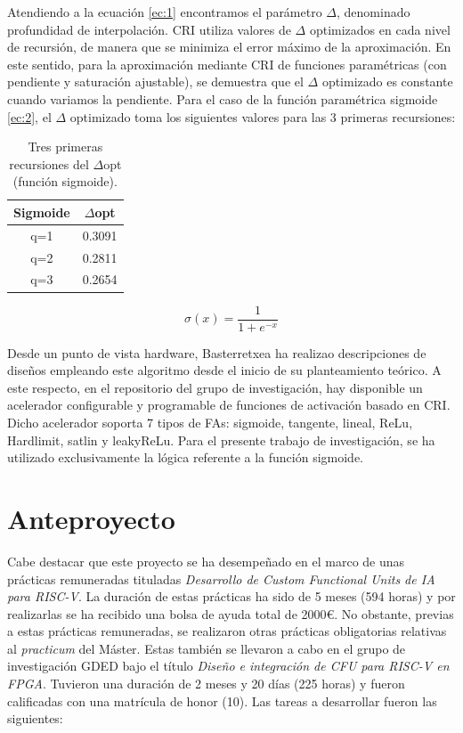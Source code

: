 Atendiendo a la ecuación \eqref{ec:1} encontramos el parámetro $\Delta$, denominado profundidad de interpolación.
CRI utiliza valores de $\Delta$ optimizados en cada nivel de recursión, de manera que se minimiza el error máximo de la aproximación.
En este sentido, para la aproximación mediante CRI de funciones paramétricas (con pendiente y saturación ajustable), se demuestra que el $\Delta$ optimizado es constante cuando variamos la pendiente.
Para el caso de la función paramétrica sigmoide \eqref{ec:2}, el $\Delta$ optimizado toma los siguientes valores para las 3 primeras recursiones:

\begin{table}[h!]
\centering
\caption{Tres primeras recursiones del $\Delta$opt (función sigmoide).}
\label{tab:1}
\begin{tabular}{|c|c|}
\hline
Sigmoide & $\Delta$opt    \\ \hline
q=1      & 0.3091 \\ \hline
q=2      & 0.2811 \\ \hline
q=3      & 0.2654 \\ \hline
\end{tabular}
\end{table}

\begin{equation}\label{ec:2}
\sigma(x)= \frac{1}{1 + e^{-x}}\tag{**}
\end{equation}

Desde un punto de vista hardware, Basterretxea ha realizao descripciones de diseños empleando este algoritmo desde el inicio de su planteamiento teórico.
A este respecto, en el repositorio del grupo de investigación, hay disponible un acelerador configurable y programable de funciones de activación basado en CRI.
Dicho acelerador soporta 7 tipos de FAs: sigmoide, tangente, lineal, ReLu, Hardlimit, satlin y leakyReLu. 
Para el presente trabajo de investigación, se ha utilizado exclusivamente la lógica referente a la función sigmoide.

\section{Anteproyecto}

\label{antepro}

Cabe destacar que este proyecto se ha desempeñado en el marco de unas prácticas remuneradas tituladas \textit{Desarrollo de Custom Functional Units de IA para RISC-V}.
La duración de estas prácticas ha sido de 5 meses (594 horas) y por realizarlas se ha recibido una bolsa de ayuda total de 2000€.
No obstante, previas a estas prácticas remuneradas, se realizaron otras prácticas obligatorias relativas al \textit{practicum} del Máster.
Estas también se llevaron a cabo en el grupo de investigación GDED bajo el título \textit{Diseño e integración de CFU para RISC-V en FPGA}.
Tuvieron una duración de 2 meses y 20 días (225 horas) y fueron calificadas con una matrícula de honor (10).
Las tareas a desarrollar fueron las siguientes:

